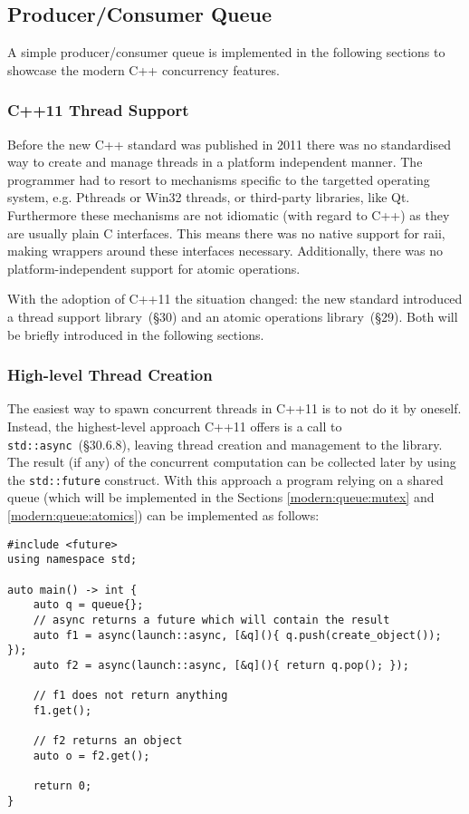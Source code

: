 \subsection{Producer/Consumer Queue}\label{modern:queue}

A simple producer/consumer queue is implemented in the following sections to showcase the modern C++ concurrency features.

\subsubsection{C++11 Thread Support}\label{modern:queue:support}

Before the new C++ standard was published in 2011 there was no standardised way to create and manage threads in a platform independent manner. The programmer had to resort to mechanisms specific to the targetted operating system, e.g. Pthreads or Win32 threads, or third-party libraries, like Qt. Furthermore these mechanisms are not idiomatic (with regard to C++) as they are usually plain C interfaces. This means there was no native support for \gls{raii}, making wrappers around these interfaces necessary. Additionally, there was no platform-independent support for atomic operations.

With the adoption of C++11 the situation changed: the new standard introduced a thread support library~\cite{cpp11std}(§30) and an atomic operations library~\cite{cpp11std}(§29). Both will be briefly introduced in the following sections.

\subsubsection{High-level Thread Creation}\label{modern:queue:futures}

The easiest way to spawn concurrent threads in C++11 is to not do it by oneself. Instead, the highest-level approach C++11 offers is a call to \texttt{std::async}~\cite{cpp11std}(§30.6.8), leaving thread creation and management to the library. The result (if any) of the concurrent computation can be collected later by using the \texttt{std::future} construct. With this approach a program relying on a shared queue (which will be implemented in the Sections \ref{modern:queue:mutex} and \ref{modern:queue:atomics}) can be implemented as follows:

\begin{verbatim}
#include <future>
using namespace std;

auto main() -> int {
    auto q = queue{};
    // async returns a future which will contain the result
    auto f1 = async(launch::async, [&q](){ q.push(create_object()); });
    auto f2 = async(launch::async, [&q](){ return q.pop(); });
 
    // f1 does not return anything
    f1.get();

    // f2 returns an object
    auto o = f2.get();

    return 0;
}
\end{verbatim}

